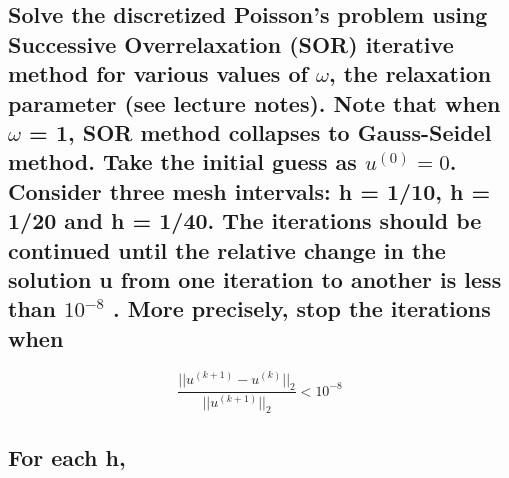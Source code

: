 \documentclass[11pt]{article}
\begin{document}
    \hypertarget{solve-the-discretized-poissons-problem-using-successive-overrelaxation-sor-iterative-method-for-various-values-of-omega-the-relaxation-parameter-see-lecture-notes.-note-that-when-omega-1-sor-method-collapses-to-gauss-seidel-method.-take-the-initial-guess-as-u0-0.-consider-three-mesh-intervals-h-110-h-120-and-h-140.-the-iterations-should-be-continued-until-the-relative-change-in-the-solution-u-from-one-iteration-to-another-is-less-than-10-8-.-more-precisely-stop-the-iterations-when}{%
\subsection{\texorpdfstring{Solve the discretized Poisson's problem
using Successive Overrelaxation (SOR) iterative method for various
values of \(\omega\), the relaxation parameter (see lecture notes). Note
that when \(\omega\) = 1, SOR method collapses to Gauss-Seidel method.
Take the initial guess as \(u^{(0)} = 0\). Consider three mesh
intervals: h = 1/10, h = 1/20 and h = 1/40. The iterations should be
continued until the relative change in the solution u from one iteration
to another is less than \(10^{-8}\) . More precisely, stop the
iterations
when}{Solve the discretized Poisson's problem using Successive Overrelaxation (SOR) iterative method for various values of \textbackslash{}omega, the relaxation parameter (see lecture notes). Note that when \textbackslash{}omega = 1, SOR method collapses to Gauss-Seidel method. Take the initial guess as u\^{}\{(0)\} = 0. Consider three mesh intervals: h = 1/10, h = 1/20 and h = 1/40. The iterations should be continued until the relative change in the solution u from one iteration to another is less than 10\^{}\{-8\} . More precisely, stop the iterations when}}\label{solve-the-discretized-poissons-problem-using-successive-overrelaxation-sor-iterative-method-for-various-values-of-omega-the-relaxation-parameter-see-lecture-notes.-note-that-when-omega-1-sor-method-collapses-to-gauss-seidel-method.-take-the-initial-guess-as-u0-0.-consider-three-mesh-intervals-h-110-h-120-and-h-140.-the-iterations-should-be-continued-until-the-relative-change-in-the-solution-u-from-one-iteration-to-another-is-less-than-10-8-.-more-precisely-stop-the-iterations-when}}

    \[\frac{||u^{(k+1)}-u^{(k)}||_2}{||u^{(k+1)}||_2} < 10^{-8} \tag{3}\]

    \hypertarget{for-each-h}{%
\subsection{For each h,}\label{for-each-h}}
\end{document}
